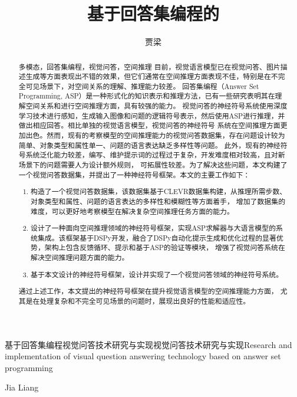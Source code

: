 \title{基于回答集编程的}{基于回答集编程}{视觉问答技术研究与实现}{视觉问答技术研究与实现}{Research and implementation of visual question answering technology }{based on answer set programming}
\author{贾梁}{Jia Liang}
\makebigcover
\makecover
\begin{abstract}{多模态，回答集编程，视觉问答，空间推理}
    目前，视觉语言模型已在视觉问答、图片描述生成等方面表现出不错的效果，但它们通常在空间推理方面表现不佳，特别是在不完全可见场景下，对空间关系的理解、推理能力较差。
    回答集编程（Answer Set Programming, ASP）是一种形式化的知识表示和推理方法，已有一些研究表明其在理解空间关系和进行空间推理方面，具有较强的能力。
    视觉问答的神经符号系统使用深度学习技术进行感知，生成输入图像和问题的逻辑符号表示，然后使用ASP进行推理，并做出相应回答。相比单独的视觉语言模型，视觉问答的神经符号
    系统在空间推理方面更加出色。然而，现有的考察模型的空间推理能力的视觉问答数据集，存在问题设计较为简单、对象类型和属性单一、问题的语言表达缺乏多样性等问题。
    此外，现有的神经符号系统泛化能力较差，编写、维护提示词的过程过于复杂，开发难度相对较高，且对新场景下的问题需要人为设计额外规则，
    可拓展性较差。为了解决这些问题，本文构建了一个视觉问答数据集，并提出了一种神经符号框架。本文的主要工作如下：
\begin{enumerate}[itemsep=0pt]
    \item 构造了一个视觉问答数据集，该数据集基于CLEVR数据集构建，从推理所需步数、对象类型和属性、问题的语言表达的多样性和模糊性等方面着手，
    增加了数据集的难度，可以更好地考察模型在解决复杂空间推理任务方面的能力。
    \item 设计了一种面向空间推理领域的神经符号框架，实现ASP求解器与大语言模型的系统集成。该框架基于DSPy开发，融合了DSPy自动化提示生成和优化过程的显著优势，架构上包含反馈循环、提示和基于ASP的验证等模块，
增强了视觉问答系统在解决空间推理问题方面的能力。
    \item 基于本文设计的神经符号框架，设计并实现了一个视觉问答领域的神经符号系统。
\end{enumerate}

通过上述工作，本文提出的神经符号框架在提升视觉语言模型的空间推理能力方面，
尤其是在处理复杂和不完全可见场景的问题时，展现出良好的性能和适应性。
    
\end{abstract}

